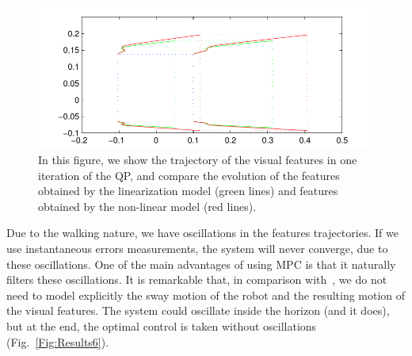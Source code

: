\begin{figure}[ht]
 \centering
 \includegraphics[scale=1]{Chap4-Visual-Servoing/comparison_linearization.pdf}
 \caption{\label{Fig:Results5}\small{In this figure, we show the trajectory of the visual features in one iteration of the QP, and compare the evolution of the features obtained by the linearization model (green lines) and features obtained by the non-linear model (red lines).}}
 \end{figure}

Due to the walking nature, we have oscillations in the features trajectories. If we use instantaneous errors measurements, the system will never converge, due to these oscillations. One of the main advantages of using MPC is that it naturally filters these oscillations. It is remarkable that, in comparison with~\cite{DuneIROS2010}, we do not need to model explicitly the sway motion of the robot and the resulting motion of the visual features. The system could oscillate inside the horizon (and it does), but at the end, the optimal control is taken without oscillations (Fig.~\ref{Fig:Results6}).

